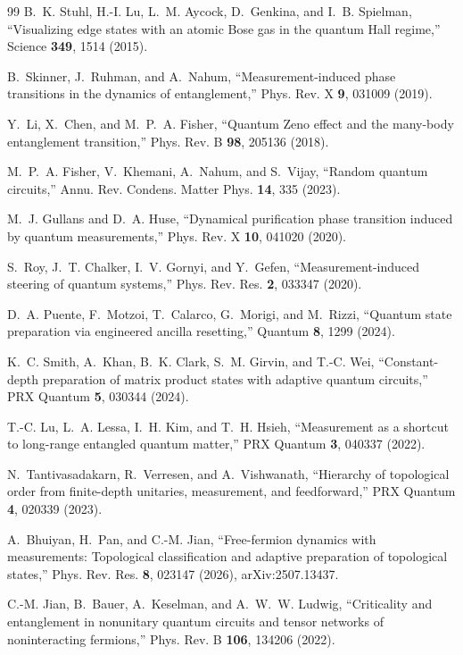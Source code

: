 \documentclass[aps,prl,twocolumn,floatfix,superscriptaddress,nofootinbib]{revtex4-2}
\begin{document}
\begin{thebibliography}{99}
B.~K. Stuhl, H.-I. Lu, L.~M. Aycock, D.~Genkina, and I.~B. Spielman,
``Visualizing edge states with an atomic Bose gas in the quantum Hall regime,''
Science \textbf{349}, 1514 (2015).

B.~Skinner, J.~Ruhman, and A.~Nahum,
``Measurement-induced phase transitions in the dynamics of entanglement,''
Phys. Rev. X \textbf{9}, 031009 (2019).

Y.~Li, X.~Chen, and M.~P.~A. Fisher,
``Quantum Zeno effect and the many-body entanglement transition,''
Phys. Rev. B \textbf{98}, 205136 (2018).

M.~P.~A. Fisher, V.~Khemani, A.~Nahum, and S.~Vijay,
``Random quantum circuits,''
Annu. Rev. Condens. Matter Phys. \textbf{14}, 335 (2023).

M.~J. Gullans and D.~A. Huse,
``Dynamical purification phase transition induced by quantum measurements,''
Phys. Rev. X \textbf{10}, 041020 (2020).

S.~Roy, J.~T. Chalker, I.~V. Gornyi, and Y.~Gefen,
``Measurement-induced steering of quantum systems,''
Phys. Rev. Res. \textbf{2}, 033347 (2020).

D.~A. Puente, F.~Motzoi, T.~Calarco, G.~Morigi, and M.~Rizzi,
``Quantum state preparation via engineered ancilla resetting,''
Quantum \textbf{8}, 1299 (2024).

K.~C. Smith, A.~Khan, B.~K. Clark, S.~M. Girvin, and T.-C. Wei,
``Constant-depth preparation of matrix product states with adaptive quantum circuits,''
PRX Quantum \textbf{5}, 030344 (2024).

T.-C. Lu, L.~A. Lessa, I.~H. Kim, and T.~H. Hsieh,
``Measurement as a shortcut to long-range entangled quantum matter,''
PRX Quantum \textbf{3}, 040337 (2022).

N.~Tantivasadakarn, R.~Verresen, and A.~Vishwanath,
``Hierarchy of topological order from finite-depth unitaries, measurement, and feedforward,''
PRX Quantum \textbf{4}, 020339 (2023).

A.~Bhuiyan, H.~Pan, and C.-M. Jian,
``Free-fermion dynamics with measurements: Topological classification and adaptive preparation of topological states,''
Phys. Rev. Res. \textbf{8}, 023147 (2026), arXiv:2507.13437.

C.-M. Jian, B.~Bauer, A.~Keselman, and A.~W.~W. Ludwig,
``Criticality and entanglement in nonunitary quantum circuits and tensor networks of noninteracting fermions,''
Phys. Rev. B \textbf{106}, 134206 (2022).


\end{thebibliography}
\end{document}
